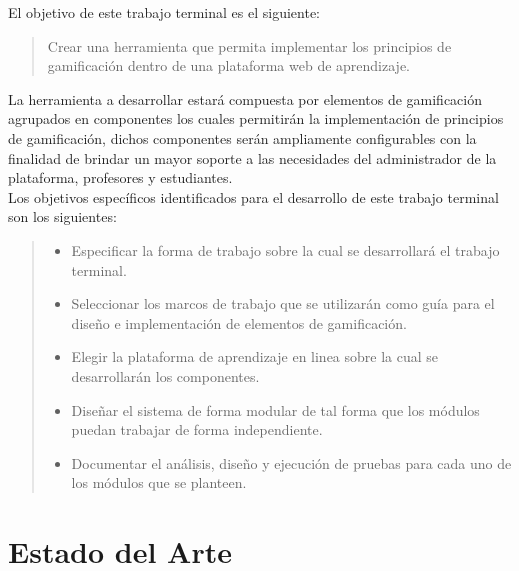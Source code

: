  \noindent El objetivo de este trabajo terminal es el siguiente:

    \begin{quote}
    \colorbox{blue!05}{\parbox{\dimexpr\linewidth-2\fboxsep}{\strut
        Crear una herramienta que permita implementar los principios
        de gamificación dentro de una plataforma web de aprendizaje.
    \strut}}
    \end{quote}

 \noindent La herramienta a desarrollar estará compuesta por elementos de gamificación agrupados en
 componentes los cuales permitirán la implementación de principios de gamificación, dichos
 componentes serán ampliamente configurables con la finalidad de brindar un mayor soporte a las
 necesidades del administrador de la plataforma, profesores y estudiantes.\\

 Los objetivos específicos identificados para el desarrollo de este trabajo terminal son los siguientes:

    \begin{quote}
    \begin{itemize}%
        \item Especificar la forma de trabajo sobre la cual se
              desarrollará el trabajo terminal.

        \item Seleccionar los marcos de trabajo que se utilizarán como
              guía para el diseño e implementación de elementos de gamificación.

        \item Elegir la plataforma de aprendizaje en linea sobre
              la cual se desarrollarán los componentes.

        \item Diseñar el sistema de forma modular de tal forma que los módulos
              puedan trabajar de forma independiente.

        \item Documentar el análisis, diseño y ejecución de pruebas para cada
              uno de los módulos que se planteen.

    \end{itemize}
    \end{quote}

\section{Estado del Arte} \label{sec:estadoArte}

